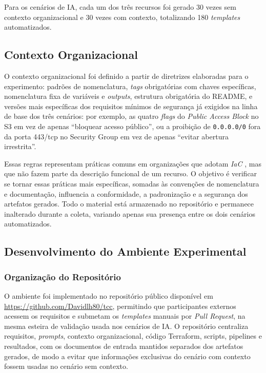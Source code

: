 Para os cenários de IA, cada um dos três recursos foi gerado 30 vezes sem contexto organizacional e 30 vezes com contexto, totalizando 180 \textit{templates} automatizados.

\subsection{Contexto Organizacional}

O contexto organizacional foi definido a partir de diretrizes elaboradas para o experimento: padrões de nomenclatura, \textit{tags} obrigatórias com chaves específicas, nomenclatura fixa de variáveis e \textit{outputs}, estrutura obrigatória do README, e versões mais específicas dos requisitos mínimos de segurança já exigidos na linha de base dos três cenários: por exemplo, as quatro \textit{flags} do \textit{Public Access Block} no S3 em vez de apenas ``bloquear acesso público'', ou a proibição de \texttt{0.0.0.0/0} fora da porta 443/tcp no Security Group em vez de apenas ``evitar abertura irrestrita''.

Essas regras representam práticas comuns em organizações que adotam \textit{IaC} \cite{morris2016infrastructure,verdet2025security}, mas que não fazem parte da descrição funcional de um recurso. O objetivo é verificar se tornar essas práticas mais específicas, somadas às convenções de nomenclatura e documentação, influencia a conformidade, a padronização e a segurança dos artefatos gerados. Todo o material está armazenado no repositório e permanece inalterado durante a coleta, variando apenas sua presença entre os dois cenários automatizados.

\subsection{Desenvolvimento do Ambiente Experimental}

\subsubsection{Organização do Repositório}

O ambiente foi implementado no repositório público disponível em \url{https://github.com/Davidlh80/tcc}, permitindo que participantes externos acessem os requisitos e submetam os \textit{templates} manuais por \textit{Pull Request}, na mesma esteira de validação usada nos cenários de IA. O repositório centraliza requisitos, \textit{prompts}, contexto organizacional, código Terraform, scripts, pipelines e resultados, com os documentos de entrada mantidos separados dos artefatos gerados, de modo a evitar que informações exclusivas do cenário com contexto fossem usadas no cenário sem contexto.

